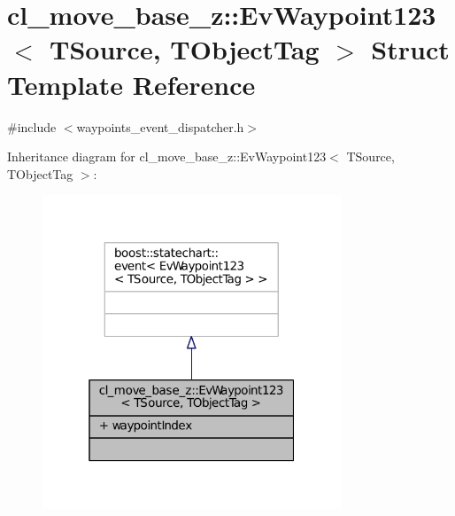 \hypertarget{structcl__move__base__z_1_1EvWaypoint123}{}\section{cl\+\_\+move\+\_\+base\+\_\+z\+:\+:Ev\+Waypoint123$<$ T\+Source, T\+Object\+Tag $>$ Struct Template Reference}
\label{structcl__move__base__z_1_1EvWaypoint123}


{\ttfamily \#include $<$waypoints\+\_\+event\+\_\+dispatcher.\+h$>$}



Inheritance diagram for cl\+\_\+move\+\_\+base\+\_\+z\+:\+:Ev\+Waypoint123$<$ T\+Source, T\+Object\+Tag $>$\+:
\nopagebreak
\begin{figure}[H]
\begin{center}
\leavevmode
\includegraphics[width=253pt]{structcl__move__base__z_1_1EvWaypoint123__inherit__graph}
\end{center}
\end{figure}



